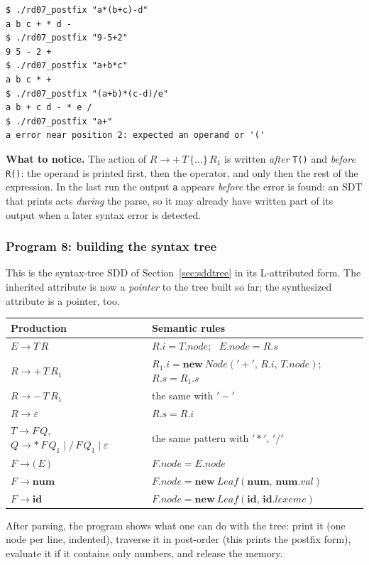 \documentclass[11pt,a4paper]{article}
\newcommand{\at}[2]{\ensuremath{#1.\mathit{#2}}}
\newcommand{\tok}[1]{\ensuremath{\mathtt{#1}}}
\begin{document}
\begin{lstlisting}[basicstyle=\ttfamily\footnotesize,tabsize=4]
$ ./rd07_postfix "a*(b+c)-d"
a b c + * d - 
$ ./rd07_postfix "9-5+2"
9 5 - 2 + 
$ ./rd07_postfix "a+b*c"
a b c * + 
$ ./rd07_postfix "(a+b)*(c-d)/e"
a b + c d - * e / 
$ ./rd07_postfix "a+"
a error near position 2: expected an operand or '('
\end{lstlisting}

\textbf{What to notice.} The action of $R\to+\,T\,\{\dots\}\,R_1$ is written \emph{after} \texttt{T()} and \emph{before} \texttt{R()}: the operand is printed first, then the operator, and only then the rest of the expression. In the last run the output \texttt{a} appears \emph{before} the error is found: an SDT that prints acts \emph{during} the parse, so it may already have written part of its output when a later syntax error is detected.

\subsubsection*{Program 8: building the syntax tree}
This is the syntax-tree SDD of Section~\ref{sec:sddtree} in its L-attributed form. The inherited attribute is now a \emph{pointer} to the tree built so far; the synthesized attribute is a pointer, too.
\begin{center}
\small
\begin{tabular}{@{}l l@{}}
\toprule
\textbf{Production} & \textbf{Semantic rules} \\ \midrule
$E \to T\,R$ & $\at{R}{i}=\at{T}{node}$; \ $\at{E}{node}=\at{R}{s}$ \\
$R \to +\,T\,R_1$ & $\at{R_1}{i}=\mathbf{new}\ \mathit{Node}(\tok{'+'},\,\at{R}{i},\,\at{T}{node})$; \ $\at{R}{s}=\at{R_1}{s}$ \\
$R \to -\,T\,R_1$ & the same with $\tok{'-'}$ \\
$R \to \varepsilon$ & $\at{R}{s}=\at{R}{i}$ \\
$T \to F\,Q$, \ $Q \to *\,F\,Q_1\mid /\,F\,Q_1\mid\varepsilon$ & the same pattern with $\tok{'*'}$, $\tok{'/'}$ \\
$F \to \tok{(}\,E\,\tok{)}$ & $\at{F}{node}=\at{E}{node}$ \\
$F \to \mathbf{num}$ & $\at{F}{node}=\mathbf{new}\ \mathit{Leaf}(\mathbf{num},\,\at{\mathbf{num}}{val})$ \\
$F \to \mathbf{id}$ & $\at{F}{node}=\mathbf{new}\ \mathit{Leaf}(\mathbf{id},\,\at{\mathbf{id}}{lexeme})$ \\ \bottomrule
\end{tabular}
\end{center}
After parsing, the program shows what one can do with the tree: print it (one node per line, indented), traverse it in post-order (this prints the postfix form), evaluate it if it contains only numbers, and release the memory.
\end{document}
